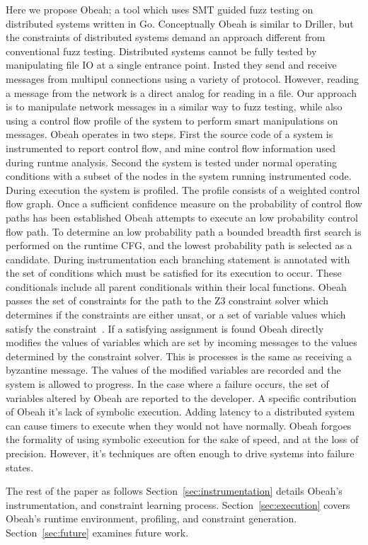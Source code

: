 Here we propose Obeah; a tool which uses SMT guided fuzz testing on distributed
systems written in Go. Conceptually Obeah is similar to Driller, but the
constraints of distributed systems demand an approach different from
conventional fuzz testing. Distributed systems cannot be fully tested by
manipulating file IO at a single entrance point. Insted they send and receive
messages from multipul connections using a variety of protocol. However,
reading a message from the network is a direct analog for reading in a file.
Our approach is to manipulate network messages in a similar way to fuzz
testing, while also using a control flow profile of the system to perform smart
manipulations on messages.  Obeah operates in two steps. First the source code
of a system is instrumented to report control flow, and mine control flow
information used during runtme analysis.  Second the system is tested under
normal operating conditions with a subset of the nodes in the system running
instrumented code. During execution the system is profiled. The profile
consists of a weighted control flow graph. Once a sufficient confidence measure
on the probability of control flow paths has been established Obeah attempts to
execute an low probability control flow path. To determine an low probability
path a bounded breadth first search is performed on the runtime CFG, and the
lowest probability path is selected as a candidate. During instrumentation each
branching statement is annotated with the set of conditions which must be
satisfied for its execution to occur. These conditionals include all parent
conditionals within their local functions.  Obeah passes the set of constraints
for the path to the Z3 constraint solver which determines if the constraints
are either unsat, or a set of variable values which satisfy the
constraint~\cite{deMoura2008}. If a satisfying assignment is found Obeah
directly modifies the values of variables which are set by incoming messages to
the values determined by the constraint solver.  This is processes is the same
as receiving a byzantine message. The values of the modified variables are
recorded and the system is allowed to progress. In the case where a failure
occurs, the set of variables altered by Obeah are reported to the developer. A
specific contribution of Obeah it's lack of symbolic execution. Adding latency
to a distributed system can cause timers to execute when they would not have
normally. Obeah forgoes the formality of using symbolic execution for the sake
of speed, and at the loss of precision.  However, it's techniques are often
enough to drive systems into failure states.


The rest of the paper as follows Section~\ref{sec:instrumentation} details
Obeah's instrumentation, and constraint learning process.
Section~\ref{sec:execution} covers Obeah's runtime environment, profiling, and
constraint generation. Section~\ref{sec:future} examines future work.



